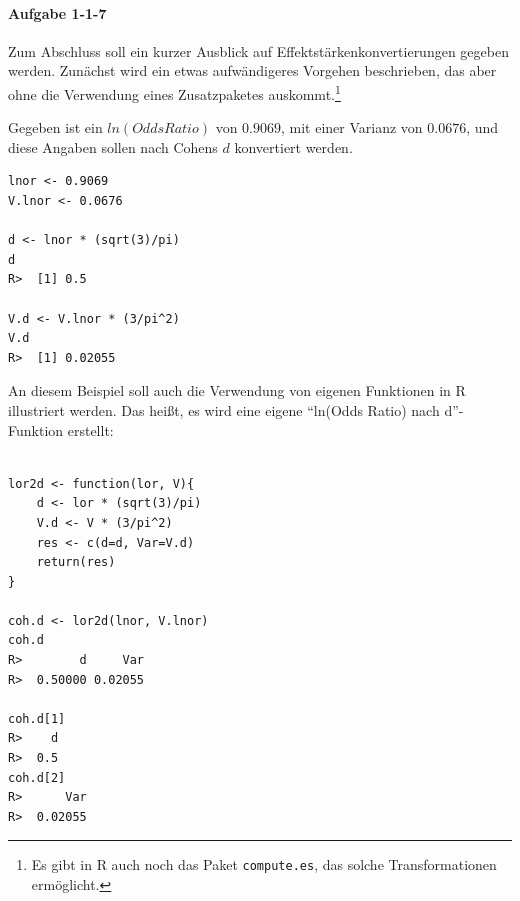 \documentclass[normalheadings, 10pt]{scrartcl}\usepackage{graphicx, color}
\makeatletter
\newenvironment{kframe}{%
 \def\at@end@of@kframe{}%
 \ifinner\ifhmode%
  \def\at@end@of@kframe{\end{minipage}}%
  \begin{minipage}{\columnwidth}%
 \fi\fi%
 \def\FrameCommand##1{\hskip\@totalleftmargin \hskip-\fboxsep
 \colorbox{shadecolor}{##1}\hskip-\fboxsep
     \hskip-\linewidth \hskip-\@totalleftmargin \hskip\columnwidth}%
 \MakeFramed {\advance\hsize-\width
   \@totalleftmargin\z@ \linewidth\hsize
   \@setminipage}}%
 {\par\unskip\endMakeFramed%
 \at@end@of@kframe}
\newenvironment{knitrout}{}{} %
\makeatother
\begin{document}
\paragraph{Aufgabe 1-1-7} Zum Abschluss soll ein kurzer Ausblick auf
Effektstärkenkonvertierungen gegeben werden. Zunächst wird ein etwas
aufwändigeres Vorgehen beschrieben, das aber ohne die Verwendung eines
Zusatzpaketes auskommt.\footnote{Es gibt in R auch noch das Paket
  \texttt{compute.es}, das solche Transformationen ermöglicht.}

Gegeben ist ein $ln(Odds Ratio)$ von $0.9069$, mit einer Varianz von $0.0676$, und
diese Angaben sollen nach Cohens $d$ konvertiert werden.

\begin{rbsp}
\begin{knitrout}
\color{fgcolor}\begin{kframe}
\begin{verbatim}
lnor <- 0.9069
V.lnor <- 0.0676

d <- lnor * (sqrt(3)/pi)
d
R>  [1] 0.5

V.d <- V.lnor * (3/pi^2)
V.d
R>  [1] 0.02055
\end{verbatim}
\end{kframe}
\end{knitrout}

\end{rbsp}


An diesem Beispiel soll auch die Verwendung von eigenen Funktionen in R illustriert
werden. Das heißt, es wird eine eigene "`ln(Odds Ratio) nach d"'-Funktion
erstellt:

\begin{rbsp}
\begin{knitrout}
\color{fgcolor}\begin{kframe}
\begin{verbatim}

lor2d <- function(lor, V){
    d <- lor * (sqrt(3)/pi)
    V.d <- V * (3/pi^2)
    res <- c(d=d, Var=V.d)
    return(res)
}

coh.d <- lor2d(lnor, V.lnor)
coh.d
R>        d     Var 
R>  0.50000 0.02055

coh.d[1]
R>    d 
R>  0.5
coh.d[2]
R>      Var 
R>  0.02055
\end{verbatim}
\end{kframe}
\end{knitrout}

\end{rbsp}
\end{document}
